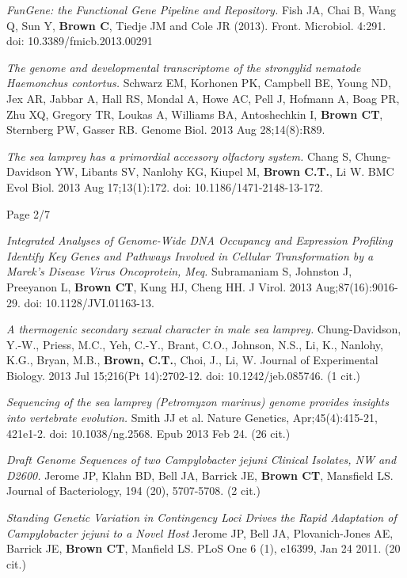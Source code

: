 \documentclass[margin,line]{resume}
\begin{document}
\begin{resume}
{\em FunGene: the Functional Gene Pipeline and Repository.} Fish JA, Chai B, Wang Q, Sun Y, {\bf Brown C}, Tiedje JM and Cole JR (2013).  Front. Microbiol. 4:291. doi: 10.3389/fmicb.2013.00291

{\em The genome and developmental transcriptome of the strongylid
  nematode Haemonchus contortus.}  Schwarz EM, Korhonen PK, Campbell
BE, Young ND, Jex AR, Jabbar A, Hall RS, Mondal A, Howe AC, Pell J,
Hofmann A, Boag PR, Zhu XQ, Gregory TR, Loukas A, Williams BA,
Antoshechkin I, {\bf Brown CT}, Sternberg PW, Gasser RB.  Genome
Biol. 2013 Aug 28;14(8):R89.

{\em The sea lamprey has a primordial accessory olfactory system.}
Chang S, Chung-Davidson YW, Libants SV, Nanlohy KG, Kiupel M, {\bf
  Brown C.T.}, Li W. BMC Evol Biol. 2013 Aug 17;13(1):172. doi:
10.1186/1471-2148-13-172.

\vspace{1cm}
{\centerline {Page 2/7}}

\newpage

{\em Integrated Analyses of Genome-Wide DNA Occupancy and Expression
  Profiling Identify Key Genes and Pathways Involved in Cellular
  Transformation by a Marek's Disease Virus Oncoprotein, Meq.}
Subramaniam S, Johnston J, Preeyanon L, {\bf Brown CT}, Kung HJ, Cheng
HH. J Virol. 2013 Aug;87(16):9016-29. doi: 10.1128/JVI.01163-13.

{\em A thermogenic secondary sexual character in male sea lamprey.}
Chung-Davidson, Y.-W., Priess, M.C., Yeh, C.-Y., Brant, C.O., Johnson,
N.S., Li, K., Nanlohy, K.G., Bryan, M.B., {\bf Brown, C.T.}, Choi, J.,
Li, W. Journal of Experimental Biology. 2013 Jul 15;216(Pt
14):2702-12. doi: 10.1242/jeb.085746. (1 cit.)

{\em Sequencing of the sea lamprey (Petromyzon marinus) genome provides insights into vertebrate evolution.} Smith JJ et al. Nature Genetics, Apr;45(4):415-21, 421e1-2. doi: 10.1038/ng.2568. Epub 2013 Feb 24. (26 cit.)

{\em Draft Genome Sequences of two Campylobacter jejuni Clinical Isolates,
NW and D2600.} Jerome JP, Klahn BD, Bell JA, Barrick JE, {\bf Brown CT}, Mansfield LS. Journal of Bacteriology, 194 (20), 5707-5708. (2 cit.)

{\em Standing Genetic Variation in Contingency Loci Drives the Rapid
  Adaptation of Campylobacter jejuni to a Novel Host} Jerome JP, Bell
JA, Plovanich-Jones AE, Barrick JE, {\bf Brown CT}, Manfield LS.  PLoS One 6
(1), e16399, Jan 24 2011. (20 cit.)


\end{resume}
\end{document}
